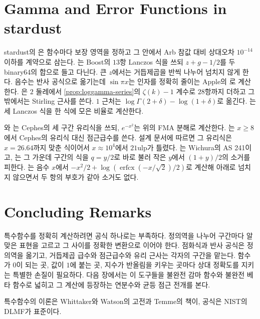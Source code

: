 \section{Gamma and Error Functions in stardust}
\label{sec:special1-stardust}

\begin{instardust}
stardust의 은 함수마다 보장 영역을 정하고 그 안에서 Arb 참값 대비 상대오차 $10^{-14}$ 이하를 계약으로 삼는다. 는 Boost의 $13$항 Lanczos 식을 쓰되 $z+g-1/2$를 두 binary64의 합으로 들고 다닌다. 큰 $z$에서는 거듭제곱을 반씩 나누어 넘치지 않게 한다. 음수는 반사 공식으로 옮기는데 $\sin\pi x$는 인자를 정확히 줄이는 Apple의 로 계산한다. 은 $2$ 둘레에서 \cref{prop:loggamma-series}의 $\zeta(k)-1$ 계수로 $28$항까지 더하고 그 밖에서는 Stirling 근사를 쓴다. $1$ 근처는 $\log\Gamma(2+\delta)-\log(1+\delta)$로 옮긴다. 는 세 Lanczos 식을 한 식에 모은 비율로 계산한다.
\end{instardust}

\begin{instardust}
와 는 Cephes의 세 구간 유리식을 쓰되, $e^{-x^2}$는 위의 FMA 분해로 계산한다. 는 $x\ge8$에서 Cephes의 유리식 대신 점근급수를 쓴다. 설계 문서에 따르면 그 유리식은 $x=26.64$까지 맞춘 식이어서 $x\approx10^4$에서 $21$ulp가 틀렸다. 는 Wichura의 AS 241이고, 는 그 가운데 구간의 식을 $q=y/2$로 바로 불러 작은 $y$에서 $(1+y)/2$의 소거를 피한다. 는 음수 $x$에서 $-x^2/2+\log(\operatorname{erfcx}(-x/\sqrt2)/2)$로 계산해 아래로 넘치지 않으면서 두 항의 부호가 같아 소거도 없다.
\end{instardust}

\section{Concluding Remarks}

특수함수를 정확히 계산하려면 공식 하나로는 부족하다. 정의역을 나누어 구간마다 알맞은 표현을 고르고 그 사이를 정확한 변환으로 이어야 한다. 점화식과 반사 공식은 정의역을 옮기고, 거듭제곱 급수와 점근급수와 유리 근사는 각자의 구간을 맡는다. 함수가 $0$이 되는 곳, 값이 $1$에 붙는 곳, 지수가 반올림을 키우는 곳마다 상대 정확도를 지키는 특별한 손질이 필요하다. 다음 장에서는 이 도구들을 불완전 감마 함수와 불완전 베타 함수로 넓히고 그 계산에 등장하는 연분수와 균등 점근 전개를 본다.

특수함수의 이론은 Whittaker와 Watson의 고전\cite{whittaker1927}과 Temme의 책\cite{temme1996}이, 공식은 NIST의 DLMF\cite{dlmf}가 표준이다.

\chapterreferences
